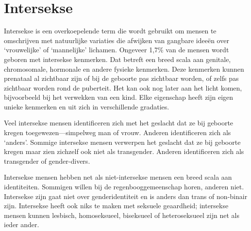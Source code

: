 \documentclass[12pt,openany]{book}
\begin{document}
\begin{figure}[h]
    \centering
\end{figure}

\section*{Intersekse}

Intersekse is een overkoepelende term die wordt gebruikt om mensen te omschrijven met natuurlijke variaties die afwijken van gangbare ideeën over `vrouwelijke' of `mannelijke' lichamen. Ongeveer 1,7\% van de mensen wordt geboren met intersekse kenmerken. Dat betreft een breed scala aan genitale, chromosomale, hormonale en andere fysieke kenmerken. Deze kenmerken kunnen prenataal al zichtbaar zijn of bij de geboorte pas zichtbaar worden, of zelfs pas zichtbaar worden rond de puberteit. Het kan ook nog later aan het licht komen, bijvoorbeeld bij het verwekken van een kind. Elke eigenschap heeft zijn eigen unieke kenmerken en uit zich in verschillende gradaties.

Veel intersekse mensen identificeren zich met het geslacht dat ze bij geboorte kregen toegewezen—simpelweg man of vrouw. Anderen identificeren zich als `anders'. Sommige intersekse mensen verwerpen het geslacht dat ze bij geboorte kregen maar zien zichzelf ook niet als transgender. Anderen identificeren zich als transgender of gender-divers.  

Intersekse mensen hebben net als niet-intersekse mensen een breed scala aan identiteiten. Sommigen willen bij de regenbooggemeenschap horen, anderen niet. Intersekse zijn gaat niet over genderidentiteit en is anders dan trans of non-binair zijn. Intersekse heeft ook niks te maken met seksuele geaardheid; intersekse mensen kunnen lesbisch, homoseksueel, biseksueel of heteroseksueel zijn net als ieder ander.
\end{document}

